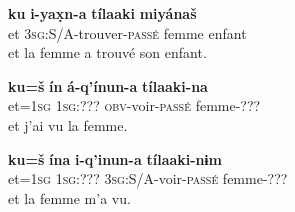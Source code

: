 \documentclass[oldfontcommands,twoside,a4paper,12pt]{article}
\newcommand{\ipa}[1]{{\phon\textbf{#1}}}
\begin{document}
\begin{landscape}
\begin{multicols}{2}
 \begin{exe}
\ex 
\gll
\ipa{ku}  	\ipa{i-yax̣n-a}  \ipa{tílaaki}  	\ipa{miyánaš}   \\
		et \textsc{3sg}:S/A-trouver-\textsc{passé} femme enfant \\
\glt  et la femme a trouvé son enfant.
\end{exe}

 
 \begin{exe}
\ex 
\gll
\ipa{ku=š}  	\ipa{ín}  	\ipa{á-q'ínun-a}  	\ipa{tílaaki-na}  \\
et=\textsc{1sg} \textsc{1sg}:??? \textsc{obv}-voir-\textsc{passé} femme-??? \\
\glt et j'ai vu la femme.
\end{exe}

 \begin{exe}
\ex 
\gll
\ipa{ku=š}  	\ipa{ína}  	\ipa{i-q'inun-a}  	\ipa{tílaaki-nɨm}  \\
et=\textsc{1sg} \textsc{1sg}:???  \textsc{3sg}:S/A-voir-\textsc{passé} femme-??? \\
\glt et la femme m'a vu.
\end{exe}

\end{multicols}
\end{landscape}
\end{document}
